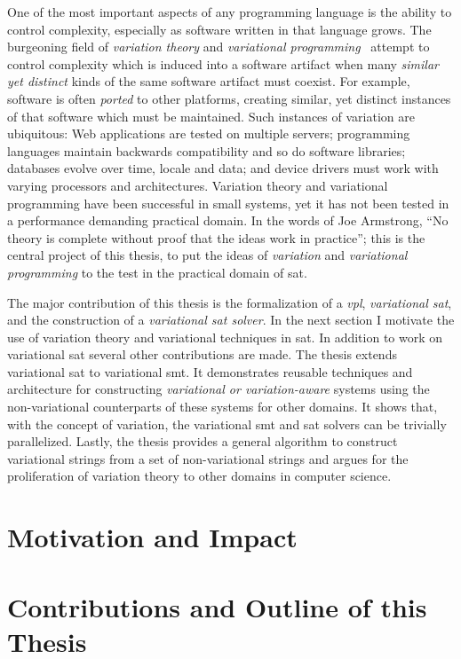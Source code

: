 One of the most important aspects of any programming language is the ability to
control complexity, especially as software written in that language grows. The
burgeoning field of \emph{variation theory} and \emph{variational
  programming}~\cite{EW11gttse,EW11tosem,HW16fosd,CEW16ecoop,Walk14onward}
attempt to control complexity which is induced into a software artifact when
many \emph{similar yet distinct} kinds of the same software artifact must
coexist. For example, software is often \emph{ported} to other platforms,
creating similar, yet distinct instances of that software which must be
maintained. Such instances of variation are ubiquitous: Web applications are
tested on multiple servers; programming languages maintain backwards
compatibility and so do software libraries; databases evolve over time, locale
and data; and device drivers must work with varying processors and
architectures. Variation theory and variational programming have been successful
in small systems, yet it has
not been tested in a performance demanding practical domain. In the words of Joe
Armstrong\cite{armstrongThesis}, ``No theory is complete without proof that the
ideas work in practice''; this is the central project of this thesis, to put the
ideas of \emph{variation} and \emph{variational programming} to the test in the
practical domain of \ac{sat}.

The major contribution of this thesis is the formalization of a \emph{\ac{vpl}},
\emph{variational \acl{sat}}, and the construction of a \emph{variational
  \ac{sat} solver}. In the next section I motivate the use of variation theory
and variational techniques in \acl{sat}. In addition to work on variational
\ac{sat} several other contributions are made. The thesis extends variational
\acl{sat} to variational \ac{smt}. It demonstrates reusable techniques and
architecture for constructing \emph{variational or variation-aware} systems
using the non-variational counterparts of these systems for other domains. It
shows that, with the concept of variation, the variational \ac{smt} and \ac{sat}
solvers can be trivially parallelized. Lastly, the thesis provides a general
algorithm to construct variational strings from a set of non-variational strings
and argues for the proliferation of variation theory to other domains in
computer science.

\section{Motivation and Impact}


\section{Contributions and Outline of this Thesis}


